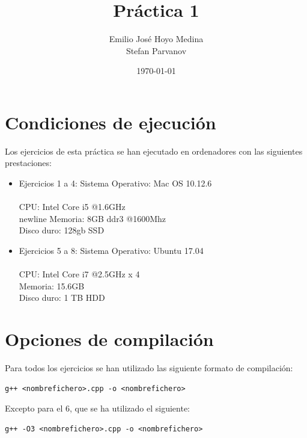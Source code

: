 \documentclass{article}
\begin{document}
\lstset{numbers=left}
      
\title{Práctica 1}
\author{Emilio José Hoyo Medina\\ Stefan Parvanov}
\date{\today}
\maketitle



\clearpage
\section{Condiciones de ejecución}
Los ejercicios de esta práctica se han ejecutado en ordenadores con las siguientes prestaciones:
\begin{itemize}
	\item Ejercicios 1 a 4:
	Sistema Operativo: Mac OS 10.12.6 \\ \\
	CPU: Intel Core i5 @1.6GHz	\\newline
	Memoria: 8GB ddr3 @1600Mhz	\\	
	Disco duro: 128gb SSD		\\
      \item Ejercicios 5 a 8:
        Sistema Operativo: Ubuntu 17.04 \\ \\
	CPU: Intel Core i7 @2.5GHz x 4	\\
	Memoria: 15.6GB	                \\	
	Disco duro: 1 TB HDD		\\
      \end{itemize}

      
\section{Opciones de compilación}
Para todos los ejercicios se han utilizado las siguiente formato de compilación:

\begin{verbatim}
g++ <nombrefichero>.cpp -o <nombrefichero>
\end{verbatim}
Excepto para el 6, que se ha utilizado el siguiente:
\begin{verbatim}
g++ -O3 <nombrefichero>.cpp -o <nombrefichero>
\end{verbatim}
\clearpage
\end{document}
